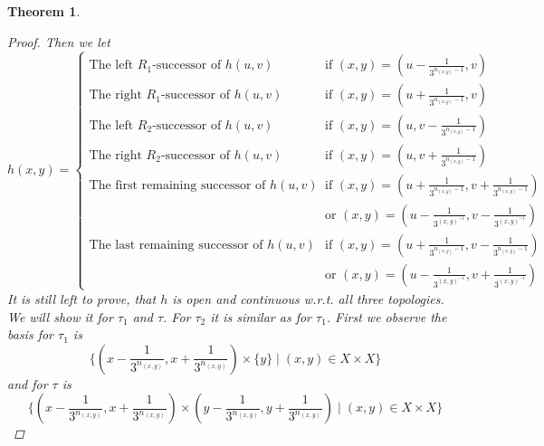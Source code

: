 \documentclass[12pt, a4paper]{scrartcl}
\newtheorem{theorem}[definition]{Theorem}
\begin{document}
\begin{theorem}
\begin{proof}





        Then we let 
        \[
            h(x,y) = 
            \begin{cases}
                \mbox{The left } R_1 \mbox{-successor of } h(u,v)  &\mbox{if } (x,y) = (u- \frac{1}{3^{n_{(x,y)}-1}},v) \\
                \mbox{The right } R_1 \mbox{-successor of } h(u,v)  &\mbox{if } (x,y) = (u+ \frac{1}{3^{n_{(x,y)}-1}},v) \\
                \mbox{The left } R_2 \mbox{-successor of } h(u,v)  &\mbox{if } (x,y) = (u, v - \frac{1}{3^{n_{(x,y)}-1}}) \\
                \mbox{The right } R_2 \mbox{-successor of } h(u,v)  &\mbox{if } (x,y) = (u, v + \frac{1}{3^{n_{(x,y)}-1}}) \\
                \mbox{The first remaining successor of } h(u,v)  &\mbox{if } (x,y) = (u+ \frac{1}{3^{n_{(x,y)}-1}}, v+ \frac{1}{3^{n_{(x,y)}-1}}) \\
                \quad &\text{or } (x, y) = (u - \frac{1}{3^{(x,y)^{-1}}}, v - \frac{1}{3^{(x,y)^{-1}}}) \\
                \mbox{The last remaining successor of } h(u,v)  &\mbox{if } (x,y) = (u+ \frac{1}{3^{n_{(x,y)}-1}}, v- \frac{1}{3^{n_{(x,y)}-1}}) \\
                \quad &\text{or } (x, y) = (u - \frac{1}{3^{(x,y)^{-1}}}, v + \frac{1}{3^{(x,y)^{-1}}}) 
                

            \end{cases}
        \]
        \clearpage
        It is still left to prove, that $h$ is open and continuous w.r.t. all three topologies. We will show it for $\tau_1$ and $\tau$. For $\tau_2$ it is similar as for $\tau_1$.\newline \newline
        First we observe the basis for $\tau_1$ is 
        $$\{(x - \frac{1}{3^{n_{(x,y)}}}, x +\frac{1}{3^{n_{(x,y)}}}) \times \{y\} \mid (x,y) \in X \times X\}$$
        and for $\tau$ is 
        $$\{(x - \frac{1}{3^{n_{(x,y)}}}, x +\frac{1}{3^{n_{(x,y)}}}) \times (y - \frac{1}{3^{n_{(x,y)}}}, y +\frac{1}{3^{n_{(x,y)}}}) \mid (x,y) \in X \times X\}$$
    \end{proof}

\end{theorem}
\end{document}
